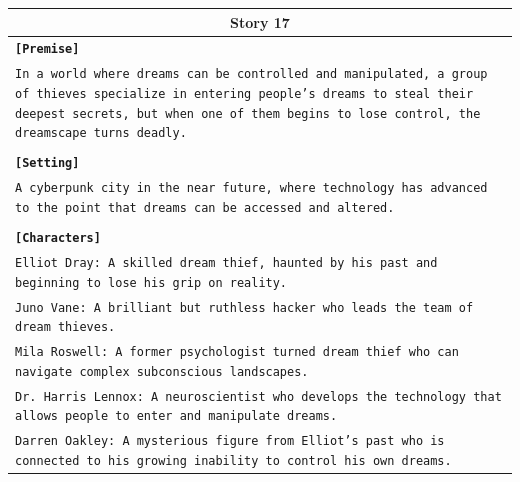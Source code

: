 \documentclass[letterpaper]{article} %
\begin{document}
\begin{small}
\begin{longtable}{p{\textwidth}}
    \multicolumn{1}{c}{\textbf{Story 17}} \\
    \midrule
    \texttt{\textbf{[Premise]}} \\
    \texttt{In a world where dreams can be controlled and manipulated, a group of thieves specialize in entering people's dreams to steal their deepest secrets, but when one of them begins to lose control, the dreamscape turns deadly.} \\\\
    \texttt{\textbf{[Setting]}} \\
    \texttt{A cyberpunk city in the near future, where technology has advanced to the point that dreams can be accessed and altered.} \\\\
    \texttt{\textbf{[Characters]}} \\
    \texttt{Elliot Dray: A skilled dream thief, haunted by his past and beginning to lose his grip on reality.} \\
    \texttt{Juno Vane: A brilliant but ruthless hacker who leads the team of dream thieves.} \\
    \texttt{Mila Roswell: A former psychologist turned dream thief who can navigate complex subconscious landscapes.} \\
    \texttt{Dr. Harris Lennox: A neuroscientist who develops the technology that allows people to enter and manipulate dreams.} \\
    \texttt{Darren Oakley: A mysterious figure from Elliot's past who is connected to his growing inability to control his own dreams.} \\
    \midrule
  

\end{longtable}
\end{small}
\end{document}
